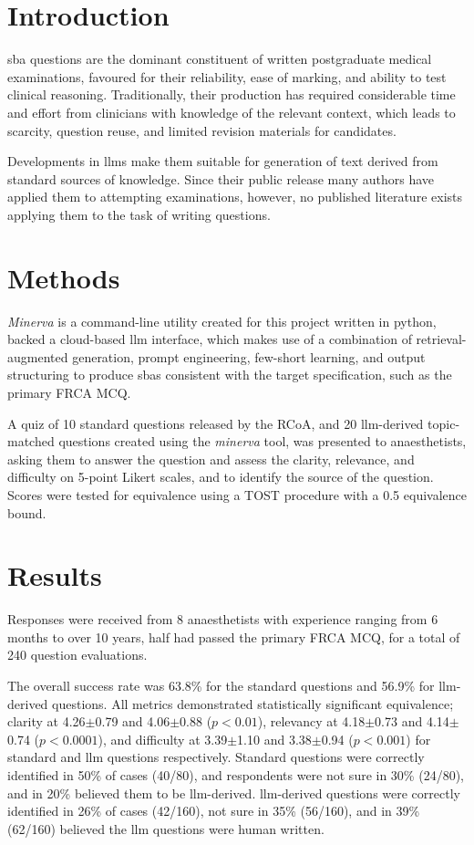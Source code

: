 \documentclass[]{scrartcl}
\begin{document}
\vspace*{-2.5cm}
\section{Introduction}
\acf{sba} questions are the dominant constituent of written postgraduate medical examinations, favoured for their reliability, ease of marking, and ability to test clinical reasoning.
Traditionally, their production has required considerable time and effort from clinicians with knowledge of the relevant context, which leads to scarcity, question reuse, and limited revision materials for candidates.

Developments in \acfp{llm} make them suitable for generation of text derived from standard sources of knowledge. Since their public release many authors have applied them to attempting examinations, however, no published literature exists applying them to the task of writing questions.

\section{Methods}
\textit{Minerva} is a command-line utility created for this project written in python, backed a cloud-based \ac{llm} interface, which makes use of a combination of retrieval-augmented generation, prompt engineering, few-short learning, and output structuring to produce \acp{sba} consistent with the target specification, such as the primary FRCA MCQ.

A quiz of 10 standard questions released by the RCoA, and 20 \ac{llm}-derived topic-matched questions created using the \textit{minerva} tool, was presented to anaesthetists, asking them to answer the question and assess the clarity, relevance, and difficulty on 5-point Likert scales, and to identify the source of the question.
Scores were tested for equivalence using a TOST procedure with a 0.5 equivalence bound.

\section{Results}
Responses were received from 8 anaesthetists with experience ranging from 6 months to over 10 years, half had passed the primary FRCA MCQ, for a total of 240 question evaluations.

The overall success rate was 63.8\% for the standard questions and 56.9\% for \ac{llm}-derived questions.
All metrics demonstrated statistically significant equivalence; clarity at 4.26$\pm$0.79 and 4.06$\pm$0.88 ($p < 0.01$), relevancy at 4.18$\pm$0.73 and 4.14$\pm$0.74 ($p < 0.0001$), and difficulty at  3.39$\pm$1.10 and 3.38$\pm$0.94 ($p < 0.001$) for standard and \ac{llm} questions respectively.
Standard questions were correctly identified in 50\% of cases (40/80), and respondents were not sure in 30\% (24/80), and in 20\% believed them to be \ac{llm}-derived. \ac{llm}-derived questions were correctly identified in 26\% of cases (42/160), not sure in 35\% (56/160), and in 39\% (62/160) believed the \ac{llm} questions were human written.
\end{document}
